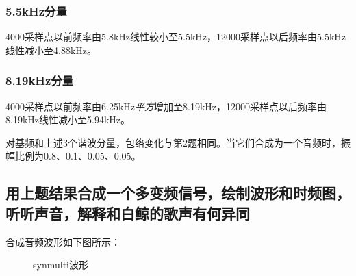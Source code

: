 \documentclass{article}
\begin{document}
            \subsubsection*{5.5kHz分量}
                4000采样点以前频率由5.8kHz线性较小至5.5kHz，12000采样点以后频率由5.5kHz线性减小至4.88kHz。
            \subsubsection*{8.19kHz分量}
                4000采样点以前频率由6.25kHz\emph{平方}增加至8.19kHz，12000采样点以后频率由8.19kHz线性减小至5.94kHz。

            对基频和上述3个谐波分量，包络变化与第2题相同。当它们合成为一个音频时，振幅比例为0.8、0.1、0.05、0.05。

        \subsection{用上题结果合成一个多变频信号，绘制波形和时频图，听听声音，解释和白鲸的歌声有何异同}
            合成音频波形如下图所示：
            \begin{figure}[htb]
                \centering
                \hspace{10pt}
                \caption{synmulti波形}
                \label{fig:synmulti}
            \end{figure}
\end{document}
